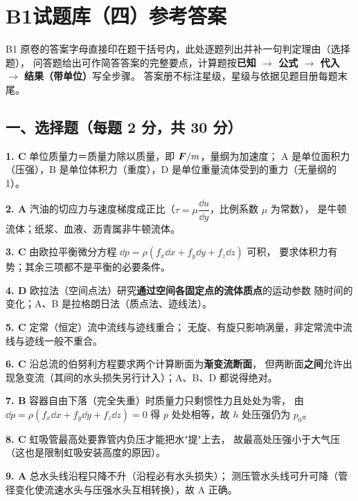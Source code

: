 \chapter*{B1\quad 试题库（四）参考答案}

\begin{tishi}
B1 原卷的答案字母直接印在题干括号内，此处逐题列出并补一句判定理由（选择题），
问答题给出可作简答答案的完整要点，计算题按\textbf{已知 $\to$ 公式 $\to$ 代入 $\to$ 结果（带单位）}写全步骤。
答案册不标注星级，星级与依据见题目册每题末尾。
\end{tishi}

\section*{一、选择题（每题 2 分，共 30 分）}

\noindent\textbf{1. C\quad} 单位质量力＝质量力除以质量，即 $\bm{F}/m$，量纲为加速度；
A 是单位面积力（压强），B 是单位体积力（重度），D 是单位重量流体受到的重力（无量纲的 1）。

\noindent\textbf{2. A\quad} 汽油的切应力与速度梯度成正比（$\tau=\mu\dfrac{\dd u}{\dd y}$，比例系数 $\mu$ 为常数），
是牛顿流体；纸浆、血液、沥青属非牛顿流体。

\noindent\textbf{3. C\quad} 由欧拉平衡微分方程 $\dd p=\rho(f_x\dd x+f_y\dd y+f_z\dd z)$ 可积，
要求体积力有势；其余三项都不是平衡的必要条件。

\noindent\textbf{4. D\quad} 欧拉法（空间点法）研究\textbf{通过空间各固定点的流体质点}的运动参数
随时间的变化；A、B 是拉格朗日法（质点法、迹线法）。

\noindent\textbf{5. C\quad} 定常（恒定）流中流线与迹线重合；
无旋、有旋只影响涡量，非定常流中流线与迹线一般不重合。

\noindent\textbf{6. C\quad} 沿总流的伯努利方程要求两个计算断面为\textbf{渐变流断面}，
但两断面\textbf{之间}允许出现急变流（其间的水头损失另行计入）；A、B、D 都说得绝对。

\noindent\textbf{7. B\quad} 容器自由下落（完全失重）时质量力只剩惯性力且处处为零，
由 $\dd p=\rho(f_x\dd x+f_y\dd y+f_z\dd z)=0$ 得 $p$ 处处相等，故 $h$ 处压强仍为 $p_0$。

\noindent\textbf{8. C\quad} 虹吸管最高处要靠管内负压才能把水"提"上去，
故最高处压强小于大气压（这也是限制虹吸安装高度的原因）。

\noindent\textbf{9. A\quad} 总水头线沿程只降不升（沿程必有水头损失）；
测压管水头线可升可降（管径变化使流速水头与压强水头互相转换），故 A 正确。

